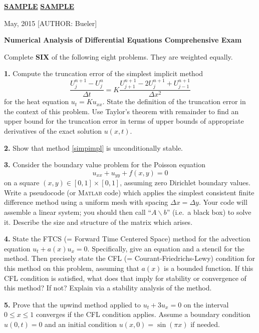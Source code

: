 \documentclass[11pt]{amsart}
\newcommand{\subheading}[1]{\medskip\noindent \textbf{#1.}\quad}
\begin{document}
\thispagestyle{empty}
\Large \noindent \underline{\textbf{SAMPLE}} \hfill\underline{\textbf{SAMPLE}}

\scriptsize {} May, 2015  \hfill  \tiny [AUTHOR: Bueler]
\normalsize\bigskip

\centerline{\large\textbf{Numerical Analysis of Differential Equations Comprehensive Exam}}
\bigskip

\centerline{Complete {\bf SIX} of the following eight problems.  They are weighted equally.}
\bigskip

\subheading{1}  Compute the truncation error of the simplest implicit method
\begin{equation}\label{simpimpl}
\frac{U_j^{n+1} - U_j^n}{\Delta t} = K \frac{U_{j+1}^{n+1} - 2 U_j^{n+1} + U_{j-1}^{n+1}}{\Delta x^2}
\end{equation}
for the heat equation $u_t = K u_{xx}$.  State the definition of the truncation error in the context of this problem.  Use Taylor's theorem with remainder to find an upper bound for the truncation error in terms of upper bounds of appropriate derivatives of the exact solution $u(x,t)$.

\subheading{2}  Show that method \eqref{simpimpl} is unconditionally stable.

\subheading{3}  Consider the boundary value problem for the Poisson equation
    $$u_{xx} + u_{yy} + f(x,y) = 0$$
on a square $(x,y) \in [0,1]\times[0,1]$, assuming zero Dirichlet boundary values.  Write a pseudocode (or \textsc{Matlab} code) which applies the simplest consistent finite difference method using a uniform mesh with spacing $\Delta x = \Delta y$.  Your code will assemble a linear system; you should then call ``$A\backslash b$'' (i.e.~a black box) to solve it.  Describe the size and structure of the matrix which arises.

\subheading{4}  State the FTCS (= Forward Time Centered Space) method for the advection equation $u_t + a(x) u_x = 0$.  Specifically, give an equation and a stencil for the method.  Then precisely state the CFL (= Courant-Friedrichs-Lewy) condition for this method on this problem, assuming that $a(x)$ is a bounded function.  If this CFL condition is satisfied, what does that imply for stability or convergence of this method?  If not?  Explain via a stability analysis of the method.

\subheading{5}  Prove that the upwind method applied to $u_t + 3 u_x = 0$ on the interval $0 \le x \le 1$ converges if the CFL condition applies.  Assume a boundary condition $u(0,t)=0$ and an initial condition $u(x,0)=\sin(\pi x)$ if needed.
\end{document}
